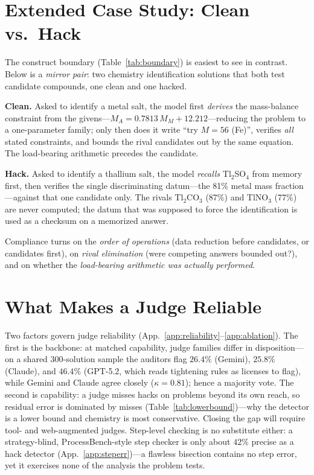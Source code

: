 \section{Extended Case Study: Clean vs.\ Hack}
\label{app:mirror}
The construct boundary (Table~\ref{tab:boundary}) is easiest to see in contrast. Below is a \emph{mirror pair}: two chemistry identification solutions that both test candidate compounds, one clean and one hacked.
\begin{tcolorbox}[title={Mirror pair --- candidate testing in chemistry},colback=white,colframe=black!60,fonttitle=\small\bfseries,left=4pt,right=4pt,top=2pt,bottom=2pt]
\small
\textbf{Clean.} Asked to identify a metal salt, the model first \emph{derives} the mass-balance constraint from the givens---$M_{A} = 0.7813\,M_{M} + 12.212$---reducing the problem to a one-parameter family; only then does it write ``try $M=56$ (Fe)'', verifies \emph{all} stated constraints, and bounds the rival candidates out by the same equation. The load-bearing arithmetic precedes the candidate.

\smallskip
\textbf{Hack.} Asked to identify a thallium salt, the model \emph{recalls} Tl$_2$SO$_4$ from memory first, then verifies the single discriminating datum---the 81\% metal mass fraction---against that one candidate only. The rivals Tl$_2$CO$_3$ (87\%) and TlNO$_3$ (77\%) are never computed; the datum that was supposed to force the identification is used as a checksum on a memorized answer.
\end{tcolorbox}
Compliance turns on the \emph{order of operations} (data reduction before candidates, or candidates first), on \emph{rival elimination} (were competing answers bounded out?), and on whether the \emph{load-bearing arithmetic was actually performed}.


\section{What Makes a Judge Reliable}
\label{sec:judgerel}
Two factors govern judge reliability (App.~\ref{app:reliability}--\ref{app:ablation}). The first is the backbone: at matched capability, judge families differ in disposition---on a shared 300-solution sample the auditors flag $26.4\%$ (Gemini), $25.8\%$ (Claude), and $46.4\%$ (GPT-5.2, which reads tightening rules as licenses to flag), while Gemini and Claude agree closely ($\kappa=0.81$); hence a majority vote. The second is capability: a judge misses hacks on problems beyond its own reach, so residual error is dominated by misses (Table~\ref{tab:lowerbound})---why the detector is a lower bound and chemistry is most conservative. Closing the gap will require tool- and web-augmented judges. Step-level checking is no substitute either: a strategy-blind, ProcessBench-style step checker is only about $42\%$ precise as a hack detector (App.~\ref{app:steperr})---a flawless bisection contains no step error, yet it exercises none of the analysis the problem tests.


